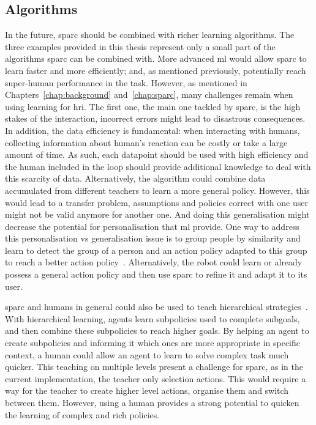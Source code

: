\subsection{Algorithms}
In the future, \gls{sparc} should be combined with richer learning algorithms. The three examples provided in this thesis represent only a small part of the algorithms \gls{sparc} can be combined with. More advanced \gls{ml} would allow \gls{sparc} to learn faster and more efficiently; and, as mentioned previously, potentially reach super-human performance in the task. However, as mentioned in Chapters~\ref{chap:background} and~\ref{chap:sparc}, many challenges remain when using learning for \gls{hri}. The first one, the main one tackled by \gls{sparc}, is the high stakes of the interaction, incorrect errors might lead to disastrous consequences. In addition, the data efficiency is fundamental: when interacting with humans, collecting information about human's reaction can be costly or take a large amount of time. As such, each datapoint should be used with high efficiency and the human included in the loop should provide additional knowledge to deal with this scarcity of data. Alternatively, the algorithm could combine data accumulated from different teachers to learn a more general policy. However, this would lead to a transfer problem, assumptions and policies correct with one user might not be valid anymore for another one. And doing this generalisation might decrease the potential for personalisation that \gls{ml} provide. One way to address this personalisation vs generalisation issue is to group people by similarity and learn to detect the group of a person and an action policy adapted to this group to reach a better action policy~\citep{brunskill2014pac}. Alternatively, the robot could learn or already possess a general action policy and then use \gls{sparc} to refine it and adapt it to its user. 

\gls{sparc} and humans in general could also be used to teach hierarchical strategies~\citep{botvinick2012hierarchical}. With hierarchical learning, agents learn subpolicies used to complete subgoals, and then combine these subpolicies to reach higher goals. By helping an agent to create subpolicies and informing it which ones are more appropriate in specific context, a human could allow an agent to learn to solve complex task much quicker. This teaching on multiple levels present a challenge for \gls{sparc}, as in the current implementation, the teacher only selection actions. This would require a way for the teacher to create higher level actions, organise them and switch between them. However, using a human provides a strong potential to quicken the learning of complex and rich policies.

